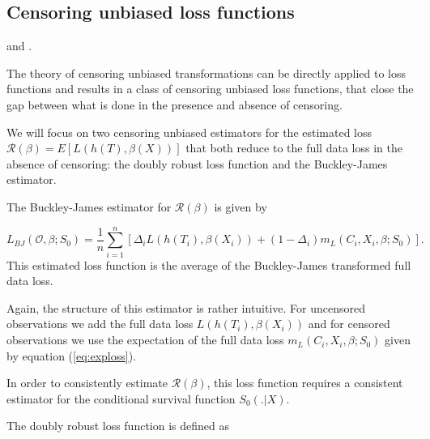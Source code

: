 \documentclass[12pt, a4paper]{article}
\theoremstyle{definition}
\theoremstyle{plain}
\numberwithin{equation}{section}
\numberwithin{figure}{section}
\numberwithin{table}{section}
\begin{document}
	\subsection{Censoring unbiased loss functions}\label{sec:cudls}
	\citet*{culs} and \citet*{basearticle}.
	
	The theory of censoring unbiased transformations can be directly applied to loss functions and results in a class of censoring unbiased loss functions, that close the gap between what is done in the presence and absence of censoring.
	
	We will focus on two censoring unbiased estimators for the estimated loss $\mathcal{R} (\beta) = E[L(h(T),\beta(X))]$ that both reduce to the full data loss in the absence of censoring: the doubly robust loss function and the Buckley-James estimator.
	
	
	The Buckley-James estimator for $\mathcal{R}(\beta)$ is given by
	
	\begin{equation}\label{eq:bj}
	L_{BJ}(\mathcal{O}, \beta; S_0) = \frac{1}{n} \sum_{i=1}^n \left[ \Delta_i L(h(T_i), \beta(X_i))+(1-\Delta_i)m_L(C_i, X_i, \beta; S_0)\right].
	\end{equation}
	This estimated loss function is the average of the Buckley-James transformed full data loss.
	
	Again, the structure of this estimator is rather intuitive.
	For uncensored observations we add the full data loss $L(h(T_i), \beta(X_i))$ and for censored observations we use the expectation of the full data loss $m_L(C_i, X_i, \beta; S_0)$ given by equation (\ref{eq:exploss}).
	
	In order to consistently estimate $\mathcal{R}(\beta)$, this loss function requires a consistent estimator for the conditional survival function $S_0(.\vert X)$.
	
	The doubly robust loss function is defined as
	
	
\end{document}
